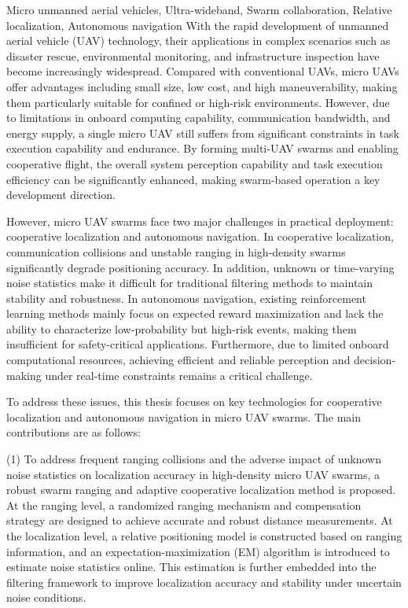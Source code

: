 \begin{englishabstract}{Micro unmanned aerial vehicles, Ultra-wideband, Swarm collaboration, Relative localization, Autonomous navigation}
   With the rapid development of unmanned aerial vehicle (UAV) technology, their applications in complex scenarios such as disaster rescue, environmental monitoring, and infrastructure inspection have become increasingly widespread. Compared with conventional UAVs, micro UAVs offer advantages including small size, low cost, and high maneuverability, making them particularly suitable for confined or high-risk environments. However, due to limitations in onboard computing capability, communication bandwidth, and energy supply, a single micro UAV still suffers from significant constraints in task execution capability and endurance.    By forming multi-UAV swarms and enabling cooperative flight, the overall system perception capability and task execution efficiency can be significantly enhanced, making swarm-based operation a key development direction.

However, micro UAV swarms face two major challenges in practical deployment: cooperative localization and autonomous navigation. In cooperative localization, communication collisions and unstable ranging in high-density swarms significantly degrade positioning accuracy. In addition, unknown or time-varying noise statistics make it difficult for traditional filtering methods to maintain stability and robustness. In autonomous navigation, existing reinforcement learning methods mainly focus on expected reward maximization and lack the ability to characterize low-probability but high-risk events, making them insufficient for safety-critical applications. Furthermore, due to limited onboard computational resources, achieving efficient and reliable perception and decision-making under real-time constraints remains a critical challenge.

To address these issues, this thesis focuses on key technologies for cooperative localization and autonomous navigation in micro UAV swarms. The main contributions are as follows:

(1) To address frequent ranging collisions and the adverse impact of unknown noise statistics on localization accuracy in high-density micro UAV swarms, a robust swarm ranging and adaptive cooperative localization method is proposed. At the ranging level, a randomized ranging mechanism and compensation strategy are designed to achieve accurate and robust distance measurements. At the localization level, a relative positioning model is constructed based on ranging information, and an expectation-maximization (EM) algorithm is introduced to estimate noise statistics online. This estimation is further embedded into the filtering framework to improve localization accuracy and stability under uncertain noise conditions.


\end{englishabstract}
